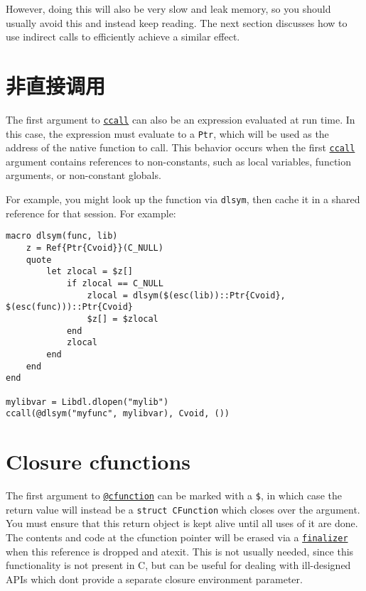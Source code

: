 However, doing this will also be very slow and leak memory, so you should usually avoid this and instead keep reading. The next section discusses how to use indirect calls to efficiently achieve a similar effect.



\hypertarget{18148794268039727850}{}


\section{非直接调用}



The first argument to \hyperlink{14245046751182637566}{\texttt{ccall}} can also be an expression evaluated at run time. In this case, the expression must evaluate to a \texttt{Ptr}, which will be used as the address of the native function to call. This behavior occurs when the first \hyperlink{14245046751182637566}{\texttt{ccall}} argument contains references to non-constants, such as local variables, function arguments, or non-constant globals.



For example, you might look up the function via \texttt{dlsym}, then cache it in a shared reference for that session. For example:




\begin{verbatim}
macro dlsym(func, lib)
    z = Ref{Ptr{Cvoid}}(C_NULL)
    quote
        let zlocal = $z[]
            if zlocal == C_NULL
                zlocal = dlsym($(esc(lib))::Ptr{Cvoid}, $(esc(func)))::Ptr{Cvoid}
                $z[] = $zlocal
            end
            zlocal
        end
    end
end

mylibvar = Libdl.dlopen("mylib")
ccall(@dlsym("myfunc", mylibvar), Cvoid, ())
\end{verbatim}



\hypertarget{11059323548475736008}{}


\section{Closure cfunctions}



The first argument to \hyperlink{11617107520401351255}{\texttt{@cfunction}} can be marked with a \texttt{\$}, in which case the return value will instead be a \texttt{struct CFunction} which closes over the argument. You must ensure that this return object is kept alive until all uses of it are done. The contents and code at the cfunction pointer will be erased via a \hyperlink{4805357059330171046}{\texttt{finalizer}} when this reference is dropped and atexit. This is not usually needed, since this functionality is not present in C, but can be useful for dealing with ill-designed APIs which don{\textquotesingle}t provide a separate closure environment parameter.




